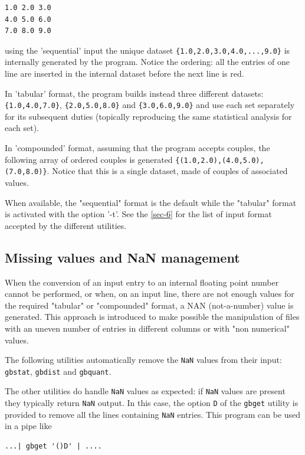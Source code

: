 \documentclass[11pt]{article}
\begin{document}
\begin{verbatim}
1.0 2.0 3.0
4.0 5.0 6.0
7.0 8.0 9.0
\end{verbatim}

using the 'sequential' input the unique dataset
\verb~{1.0,2.0,3.0,4.0,...,9.0}~ is internally generated by the
program. Notice the ordering: all the entries of one line are inserted
in the internal dataset before the next line is red.

In 'tabular' format, the program builds instead three different
datasets: \verb~{1.0,4.0,7.0}~, \verb~{2.0,5.0,8.0}~ and \verb~{3.0,6.0,9.0}~ and use
each set separately for its subsequent duties (topically reproducing
the same statistical analysis for each set).

In 'compounded' format, assuming that the program accepts couples, the
following array of ordered couples is generated
\verb~{(1.0,2.0),(4.0,5.0),(7.0,8.0)}~. Notice that this is a single
dataset, made of couples of associated values.

When available, the "sequential" format is the default while the
"tabular" format is activated with the option '-t'. See the \ref{sec-6} for the list of input format accepted by the different
utilities.

\subsection{Missing values and NaN management}
\label{sec-2-2}

When the conversion of an input entry to an internal floating point
number cannot be performed, or when, on an input line, there are not
enough values for the required "tabular" or "compounded" format, a NAN
(not-a-number) value is generated. This approach is introduced to make
possible the manipulation of files with an uneven number of entries in
different columns or with "non numerical" values.

The following utilities automatically remove the \verb~NaN~ values from their
input: \texttt{gbstat}, \texttt{gbdist} and \texttt{gbquant}.

The other utilities do handle \verb~NaN~ values as expected: if \verb~NaN~ values
are present they typically return \verb~NaN~ output. In this case, the option
\texttt{D} of the \texttt{gbget} utility is provided to remove all the lines
containing \verb~NaN~ entries. This program can be used in a pipe like

\begin{verbatim}
...| gbget '()D' | ....
\end{verbatim}
\end{document}
